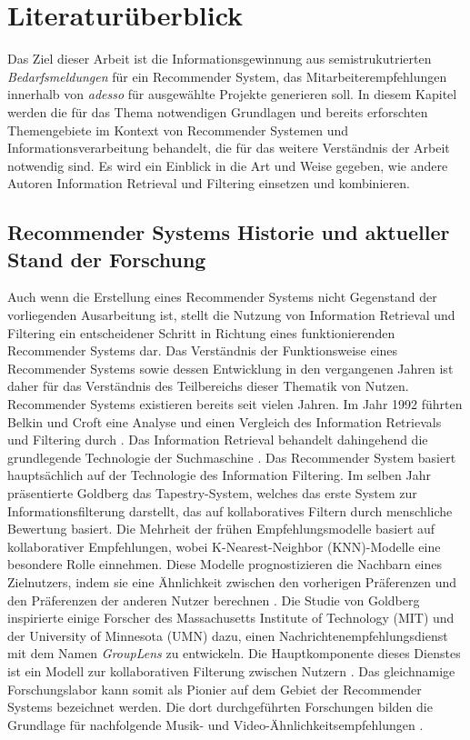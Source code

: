 \chapter{Literaturüberblick}
\label{chap:literaturüberblick}
Das Ziel dieser Arbeit ist die Informationsgewinnung aus semistrukutrierten \emph{Bedarfsmeldungen} für ein Recommender System, das Mitarbeiterempfehlungen innerhalb von \emph{adesso} für ausgewählte Projekte generieren soll. In diesem Kapitel werden die für das Thema notwendigen Grundlagen und bereits erforschten Themengebiete im Kontext von Recommender Systemen und Informationsverarbeitung behandelt, die für das weitere Verständnis der Arbeit notwendig sind. Es wird ein Einblick in die Art und Weise gegeben, wie andere Autoren Information Retrieval und Filtering einsetzen und kombinieren.

\section{Recommender Systems Historie und aktueller Stand der Forschung}
Auch wenn die Erstellung eines Recommender Systems nicht Gegenstand der vorliegenden Ausarbeitung ist, stellt die Nutzung von Information Retrieval und Filtering ein entscheidener Schritt in Richtung eines funktionierenden Recommender Systems dar. Das Verständnis der Funktionsweise eines Recommender Systems sowie dessen Entwicklung in den vergangenen Jahren ist daher für das Verständnis des Teilbereichs dieser Thematik von Nutzen.\\

Recommender Systems existieren bereits seit vielen Jahren. Im Jahr 1992 führten Belkin und Croft eine Analyse und einen Vergleich des Information Retrievals und Filtering durch \cite{dong2022brief}. Das Information Retrieval behandelt dahingehend die grundlegende Technologie der Suchmaschine \cite{dong2022brief}. Das Recommender System basiert hauptsächlich auf der Technologie des Information Filtering. Im selben Jahr präsentierte Goldberg das Tapestry-System, welches das erste System zur Informationsfilterung darstellt, das auf kollaboratives Filtern durch menschliche Bewertung basiert. Die Mehrheit der frühen Empfehlungsmodelle basiert auf kollaborativer Empfehlungen, wobei K-Nearest-Neighbor (KNN)-Modelle eine besondere Rolle einnehmen. Diese Modelle prognostizieren die Nachbarn eines Zielnutzers, indem sie eine Ähnlichkeit zwischen den vorherigen Präferenzen und den Präferenzen der anderen Nutzer berechnen \cite{dong2022brief}. Die Studie von Goldberg inspirierte einige Forscher des Massachusetts Institute of Technology (MIT) und der University of Minnesota (UMN) dazu, einen Nachrichtenempfehlungsdienst mit dem Namen \emph{GroupLens} zu entwickeln. Die Hauptkomponente dieses Dienstes ist ein Modell zur kollaborativen Filterung zwischen Nutzern \cite{dong2022brief}. Das gleichnamige Forschungslabor kann somit als Pionier auf dem Gebiet der Recommender Systems bezeichnet werden. Die dort durchgeführten Forschungen bilden die Grundlage für nachfolgende Musik- und Video-Ähnlichkeitsempfehlungen \cite{dong2022brief}. \\

